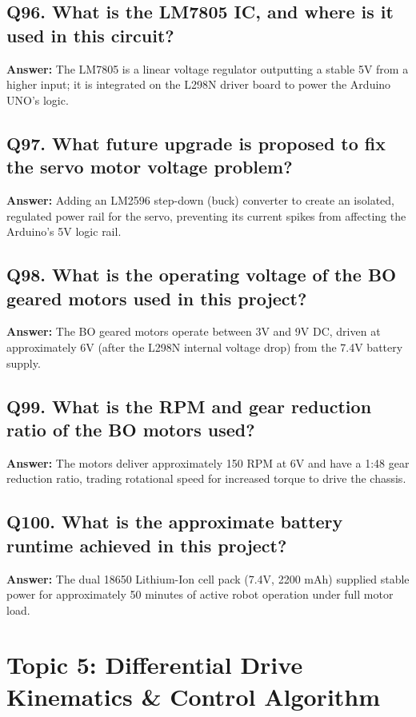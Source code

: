 \documentclass[12pt,a4paper,oneside]{report}
\begin{document}
\section{Q96. What is the LM7805 IC, and where is it used in this circuit?}
\textbf{Answer:} The LM7805 is a linear voltage regulator outputting a stable 5V from a higher input; it is integrated on the L298N driver board to power the Arduino UNO's logic.

\section{Q97. What future upgrade is proposed to fix the servo motor voltage problem?}
\textbf{Answer:} Adding an LM2596 step-down (buck) converter to create an isolated, regulated power rail for the servo, preventing its current spikes from affecting the Arduino's 5V logic rail.

\section{Q98. What is the operating voltage of the BO geared motors used in this project?}
\textbf{Answer:} The BO geared motors operate between 3V and 9V DC, driven at approximately 6V (after the L298N internal voltage drop) from the 7.4V battery supply.

\section{Q99. What is the RPM and gear reduction ratio of the BO motors used?}
\textbf{Answer:} The motors deliver approximately 150 RPM at 6V and have a 1:48 gear reduction ratio, trading rotational speed for increased torque to drive the chassis.

\section{Q100. What is the approximate battery runtime achieved in this project?}
\textbf{Answer:} The dual 18650 Lithium-Ion cell pack (7.4V, 2200 mAh) supplied stable power for approximately 50 minutes of active robot operation under full motor load.

\chapter{Topic 5: Differential Drive Kinematics \& Control Algorithm}
\end{document}
